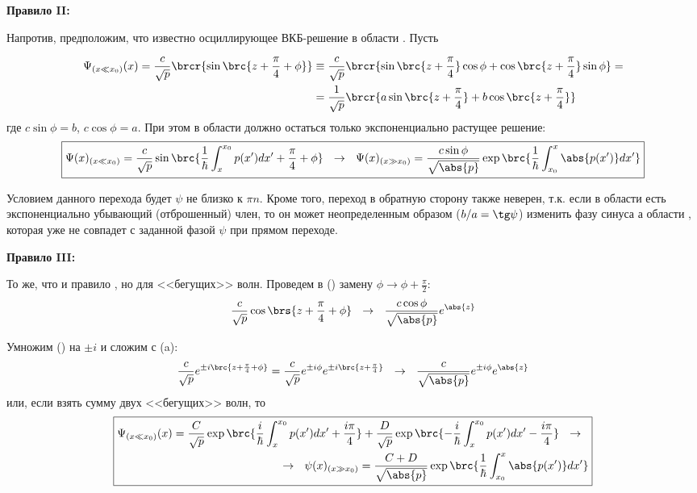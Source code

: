 \textbf{Правило II:}

Напротив, предположим, что известно осциллирующее ВКБ-решение в области . Пусть

$$
\begin{aligned}
\Psi_{(x \ll x_0)}(x) = \frac{c}{\sqrt{p}} \brcr{\sin\brc{z+\frac{\pi}{4}+\phi}} &\equiv
\frac{c}{\sqrt{p}} \brcr{\sin\brc{z+\frac{\pi}{4}}\cos{\phi} + \cos\brc{z+\frac{\pi}{4}}\sin{\phi}} =\\
&=\frac{1}{\sqrt{p}} \brcr{a \sin\brc{z+\frac{\pi}{4}} + b \cos\brc{z+\frac{\pi}{4}}}
\end{aligned}
$$
где $c\sin{\phi}=b$, $c\cos{\phi}=a$. При этом в области  должно остаться только экспоненциально растущее решение:
$$
\boxed{
	\Psi(x)_{(x \ll x_0)} = \frac{c}{\sqrt{p}} \sin\brc{\frac{1}{\hbar} \int_{x}^{x_0} p(x')dx' + \frac{\pi}{4} + \phi} ~~\rightarrow~~
	\Psi(x)_{(x \gg x_0)} = \frac{c \sin{\phi}}{\sqrt{\abs{p}}} \exp\brc{\frac{1}{\hbar} \int_{x_0}^{x} \abs{p(x')}dx'}
}
$$

Условием данного перехода будет $\psi$ не близко к $\pi n$. Кроме того, переход в обратную сторону также неверен, т.к. если в области  есть экспоненциально убывающий (отброшенный) член, то он может неопределенным образом ($b / a = \tg \psi$) изменить фазу синуса а области , которая уже не совпадет с заданной фазой $\psi$ при прямом переходе.

\textbf{Правило III:} 

То же, что и правило , но для <<бегущих>> волн. Проведем в () замену $\phi \to \phi + \frac{\pi}{2}$:
$$
\frac{c}{\sqrt{p}}\cos\brs{z+\frac{\pi}{4} + \phi} ~~\rightarrow~~ \frac{c\cos{\phi}}{\sqrt{\abs{p}}} e^{\abs{z}}
$$

Умножим () на $\pm i$ и сложим с (a):
$$
\frac{c}{\sqrt{p}} e^{\pm i\brc{z+\frac{\pi}{4}+\phi}} = \frac{c}{\sqrt{p}} e^{\pm i \phi} e^{\pm i\brc{z+\frac{\pi}{4}}} ~~\rightarrow~~
\frac{c}{\sqrt{\abs{p}}} e^{\pm i \phi} e^{\abs{z}}
$$
или, если взять сумму двух <<бегущих>> волн, то
$$
\boxed{
\begin{aligned}
	\Psi_{(x \ll x_0)}(x) = \frac{C}{\sqrt{p}} \exp\brc{\frac{i}{\hbar} \int_{x}^{x_0} p(x')dx' + \frac{i\pi}{4}} 
	+ \frac{D}{\sqrt{p}} \exp\brc{-\frac{i}{\hbar} \int_{x}^{x_0} p(x')dx' - \frac{i\pi}{4}} ~~\rightarrow~~ \\
	~~\rightarrow~~ \psi(x)_{(x \gg x_0)} = \frac{C+D}{\sqrt{\abs{p}}} \exp\brc{\frac{1}{\hbar} \int_{x_0}^{x} \abs{p(x')}dx'}
\end{aligned}
}
$$

